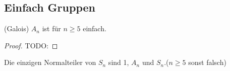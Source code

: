 \subsection{Einfach Gruppen}
\begin{theorem}(Galois)
    \(A_n\) ist f\"ur \(n\geq 5\) einfach.    
\end{theorem}
\begin{proof}
    TODO:
\end{proof}

\begin{lemma}
    Die einzigen Normalteiler von \(S_n\) sind 1, \(A_n\) und \(S_n\).(\(n\geq 5\) sonst falsch)
\end{lemma}